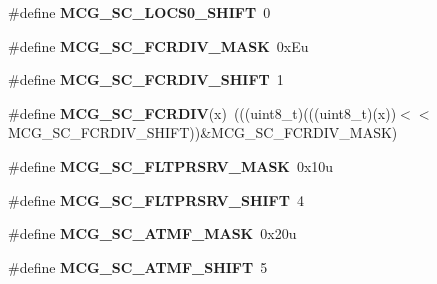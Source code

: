 \begin{DoxyCompactItemize}
\item 
\#define {\bfseries M\+C\+G\+\_\+\+S\+C\+\_\+\+L\+O\+C\+S0\+\_\+\+S\+H\+I\+FT}~0\hypertarget{group__MCG__Register__Masks_ga2a80b0f354602d5da8426e9d2b51ea12}{}\label{group__MCG__Register__Masks_ga2a80b0f354602d5da8426e9d2b51ea12}

\item 
\#define {\bfseries M\+C\+G\+\_\+\+S\+C\+\_\+\+F\+C\+R\+D\+I\+V\+\_\+\+M\+A\+SK}~0x\+Eu\hypertarget{group__MCG__Register__Masks_ga9b5d58f2f0a68eabe93f088dc2f81d2b}{}\label{group__MCG__Register__Masks_ga9b5d58f2f0a68eabe93f088dc2f81d2b}

\item 
\#define {\bfseries M\+C\+G\+\_\+\+S\+C\+\_\+\+F\+C\+R\+D\+I\+V\+\_\+\+S\+H\+I\+FT}~1\hypertarget{group__MCG__Register__Masks_gacc99cc05a01e5807395bfe11518b26e3}{}\label{group__MCG__Register__Masks_gacc99cc05a01e5807395bfe11518b26e3}

\item 
\#define {\bfseries M\+C\+G\+\_\+\+S\+C\+\_\+\+F\+C\+R\+D\+IV}(x)~(((uint8\+\_\+t)(((uint8\+\_\+t)(x))$<$$<$M\+C\+G\+\_\+\+S\+C\+\_\+\+F\+C\+R\+D\+I\+V\+\_\+\+S\+H\+I\+FT))\&M\+C\+G\+\_\+\+S\+C\+\_\+\+F\+C\+R\+D\+I\+V\+\_\+\+M\+A\+SK)\hypertarget{group__MCG__Register__Masks_ga50a0225002267599fa7a2fc341fa783a}{}\label{group__MCG__Register__Masks_ga50a0225002267599fa7a2fc341fa783a}

\item 
\#define {\bfseries M\+C\+G\+\_\+\+S\+C\+\_\+\+F\+L\+T\+P\+R\+S\+R\+V\+\_\+\+M\+A\+SK}~0x10u\hypertarget{group__MCG__Register__Masks_ga1eea80f4646116c2ca2a68aa3469436a}{}\label{group__MCG__Register__Masks_ga1eea80f4646116c2ca2a68aa3469436a}

\item 
\#define {\bfseries M\+C\+G\+\_\+\+S\+C\+\_\+\+F\+L\+T\+P\+R\+S\+R\+V\+\_\+\+S\+H\+I\+FT}~4\hypertarget{group__MCG__Register__Masks_gac75a3cb915913ba4acc64a098bba4eb5}{}\label{group__MCG__Register__Masks_gac75a3cb915913ba4acc64a098bba4eb5}

\item 
\#define {\bfseries M\+C\+G\+\_\+\+S\+C\+\_\+\+A\+T\+M\+F\+\_\+\+M\+A\+SK}~0x20u\hypertarget{group__MCG__Register__Masks_ga15326687d7d214b4847a3cae6e6cdfaa}{}\label{group__MCG__Register__Masks_ga15326687d7d214b4847a3cae6e6cdfaa}

\item 
\#define {\bfseries M\+C\+G\+\_\+\+S\+C\+\_\+\+A\+T\+M\+F\+\_\+\+S\+H\+I\+FT}~5\hypertarget{group__MCG__Register__Masks_gac7fd1ff91fc1de6800a18f875398d966}{}\label{group__MCG__Register__Masks_gac7fd1ff91fc1de6800a18f875398d966}


\end{DoxyCompactItemize}
